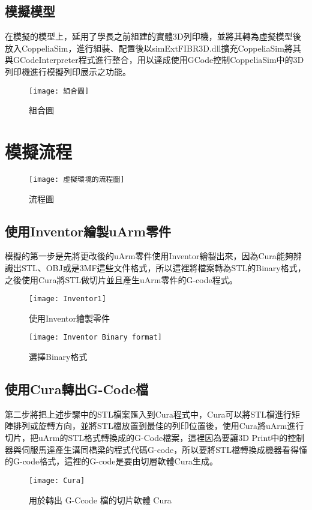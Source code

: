  \subsection{模擬模型}
 在模擬的模型上，延用了學長之前組建的實體3D列印機，並將其轉為虛擬模型後放入CoppeliaSim，進行組裝、配置後以simExtFIBR3D.dll擴充CoppeliaSim將其與GCodeInterpreter程式進行整合，用以達成使用GCode控制CoppeliaSim中的3D列印機進行模擬列印展示之功能。\\
\begin{figure}[hbt!]
\center
\texttt{[image: 組合圖]}
\caption{\Large 組合圖}
\label{組合圖}
\end{figure}


\section{模擬流程}

\begin{figure}[hbt!]
\begin{center}
\texttt{[image: 虛擬環境的流程圖]}
\caption{\Large 流程圖}\label{虛擬環境的流程圖}
\end{center}
\end{figure}
\subsection{使用Inventor繪製uArm零件}
 模擬的第一步是先將更改後的uArm零件使用Inventor繪製出來，因為Cura能夠辨識出STL、OBJ或是3MF這些文件格式，所以這裡將檔案轉為STL的Binary格式，之後使用Cura將STL做切片並且產生uArm零件的G-code程式。\\
\begin{figure}[hbt!]
\begin{center}
\texttt{[image: Inventor1]}
\caption{\Large 使用Inventor繪製零件}\label{Inventor1}
\end{center}

\begin{center}
\texttt{[image: Inventor Binary format]}
\caption{\Large 選擇Binary格式}\label{Inventor Binary format}
\end{center}
\end{figure}

\subsection{使用Cura轉出G-Code檔}
 第二步將把上述步驟中的STL檔案匯入到Cura程式中，Cura可以將STL檔進行矩陣排列或旋轉方向，並將STL檔放置到最佳的列印位置後，使用Cura將uArm進行切片，把uArm的STL格式轉換成的G-Code檔案，這裡因為要讓3D Print中的控制器與伺服馬達產生溝同橋梁的程式代碼G-code，所以要將STL檔轉換成機器看得懂的G-code格式，這裡的G-code是要由切層軟體Cura生成。\\
\begin{figure}[hbt!]
\begin{center}
\texttt{[image: Cura]}
\caption{\Large 用於轉出 G-Ccode 檔的切片軟體 Cura}\label{Cura}
\end{center}
\end{figure}
